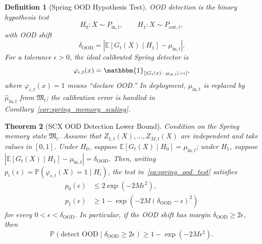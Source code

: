 \documentclass[11pt,twocolumn]{article}
\newtheorem{theorem}{Theorem}[section]
\newtheorem{definition}[theorem]{Definition}
\theoremstyle{definition}
\newcommand{\E}{\mathbb{E}}
\newcommand{\Pbb}{\mathbb{P}}
\newcommand{\ind}[1]{\mathbbm{1}_{[#1]}}
\begin{document}
\begin{definition}[Spring OOD Hypothesis Test]
\label{def:spring_ood_test}
OOD detection is the binary hypothesis test
\begin{equation}
  H_0: X \sim P_{\mathrm{in},t},
  \qquad
  H_1: X \sim P_{\mathrm{out},t},
\end{equation}
with OOD shift
\begin{equation}
  \delta_{\mathrm{OOD}}
  =
  \left|
  \E[G_t(X)\mid H_1]
  -
  \mu_{\mathrm{in},t}
  \right|.
\end{equation}
For a tolerance $\epsilon > 0$, the ideal calibrated Spring detector is
\begin{equation}
  \varphi_{\epsilon,t}(x)
  =
  \ind{\left|G_t(x)-\mu_{\mathrm{in},t}\right|>\epsilon},
  \label{eq:spring_ood_test}
\end{equation}
where $\varphi_{\epsilon,t}(x)=1$ means ``declare OOD.''  In deployment,
$\mu_{\mathrm{in},t}$ is replaced by $\widehat{\mu}_{\mathrm{in},t}$ from
$\mathfrak{M}_t$; the calibration error is handled in
Corollary~\ref{cor:spring_memory_scaling}.
\end{definition}

\begin{theorem}[SCX OOD Detection Lower Bound]
\label{thm:spring_ood_lower}
Condition on the Spring memory state $\mathfrak{M}_t$.  Assume that
$Z_{1,t}(X),\ldots,Z_{M,t}(X)$ are independent and take values in $[0,1]$.
Under $H_0$, suppose $\E[G_t(X)\mid H_0]=\mu_{\mathrm{in},t}$; under $H_1$,
suppose
$|\E[G_t(X)\mid H_1]-\mu_{\mathrm{in},t}|=\delta_{\mathrm{OOD}}$.
Then, writing
$p_i(\epsilon)=\Pbb(\varphi_{\epsilon,t}(X)=1\mid H_i)$, the test
in~\eqref{eq:spring_ood_test} satisfies
\begin{align}
  p_0(\epsilon)
    &\le 2\exp(-2M\epsilon^2), \label{eq:ood_false_alarm}\\
  p_1(\epsilon)
    &\ge
    1-\exp\!\left(-2M(\delta_{\mathrm{OOD}}-\epsilon)^2\right)
    \label{eq:ood_power_exact}
\end{align}
for every $0<\epsilon<\delta_{\mathrm{OOD}}$.  In particular, if the OOD
shift has margin $\delta_{\mathrm{OOD}}\ge 2\epsilon$, then
\begin{equation}
  \Pbb(\text{detect OOD}\mid \delta_{\mathrm{OOD}}\ge 2\epsilon)
  \ge 1-\exp(-2M\epsilon^2).
  \label{eq:ood_power_margin}
\end{equation}
\end{theorem}
\end{document}
